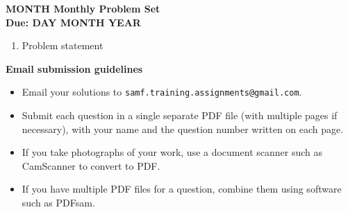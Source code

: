 \documentclass{article}
\begin{document}
\begin{center}
\textbf{\Large MONTH Monthly Problem Set}
\\ \vspace{1em}
\textbf{\large Due: DAY MONTH YEAR}
\end{center}

\begin{enumerate}[1.]

\vspace{6pt}
\item %
Problem statement

\end{enumerate}

\vfill
\textbf{\Large Email submission guidelines}
\begin{itemize}
	\item Email your solutions to \verb!samf.training.assignments@gmail.com!.
	\item Submit each question in a single separate PDF file (with multiple pages if necessary), with your name and the question number written on each page.
	\item If you take photographs of your work, use a document scanner such as CamScanner to convert to PDF.
	\item If you have multiple PDF files for a question, combine them using software such as PDFsam.
\end{itemize}
\end{document}
